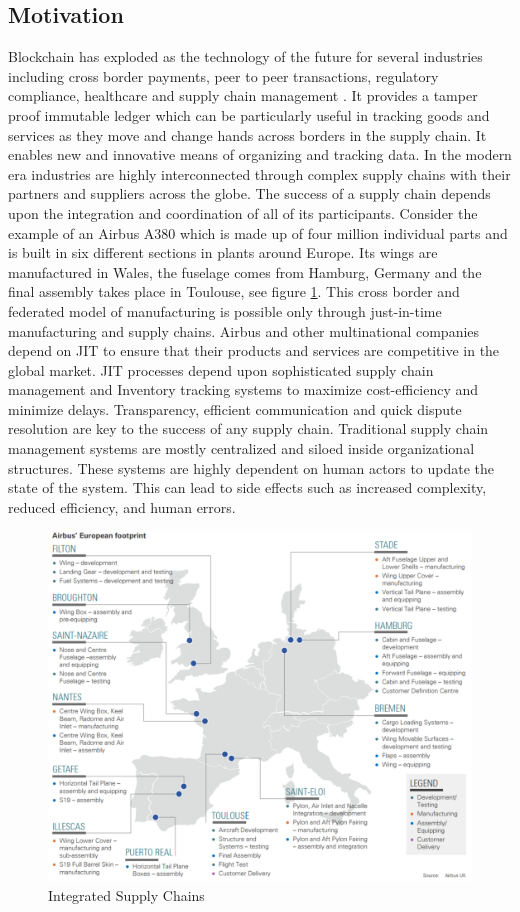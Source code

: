 \subsection{Motivation}
Blockchain has exploded as the technology of the future for several industries including cross border payments, peer to peer transactions, regulatory compliance, healthcare and supply chain management \cite{misc:021}. It provides a tamper proof immutable ledger which can be particularly useful in tracking goods and services as they move and change hands across borders in the supply chain. It enables new and innovative means of organizing and tracking data. In the modern era industries are highly interconnected through complex supply chains with their partners and suppliers across the globe. The success of a supply chain depends upon the integration and coordination of all of its participants. Consider the example of an Airbus A380 which is made up of four million individual parts and is built in six different sections in plants around Europe. Its wings are manufactured in Wales, the fuselage comes from Hamburg, Germany and the final assembly takes place in Toulouse, see figure \ref{fig:Airbus}. This cross border and federated model of manufacturing is possible only through just-in-time manufacturing and supply chains. Airbus and other multinational companies depend on JIT to ensure that their products and services are competitive in the global market. JIT processes depend upon sophisticated supply chain management and Inventory tracking systems to maximize cost-efficiency and minimize delays. Transparency, efficient communication and quick dispute resolution are key to the success of any supply chain. Traditional supply chain management systems are mostly centralized and siloed inside organizational structures. These systems are highly dependent on human actors to update the state of the system. This can lead to side effects such as increased complexity, reduced efficiency, and human errors.

\begin{figure}[h]
	\centering
    \includegraphics[width=120mm,scale=1]{figs/Airbus-1}
	\caption{Integrated Supply Chains \cite{Airbus:ADS}}
	\label{fig:Airbus} 
\end{figure} 

